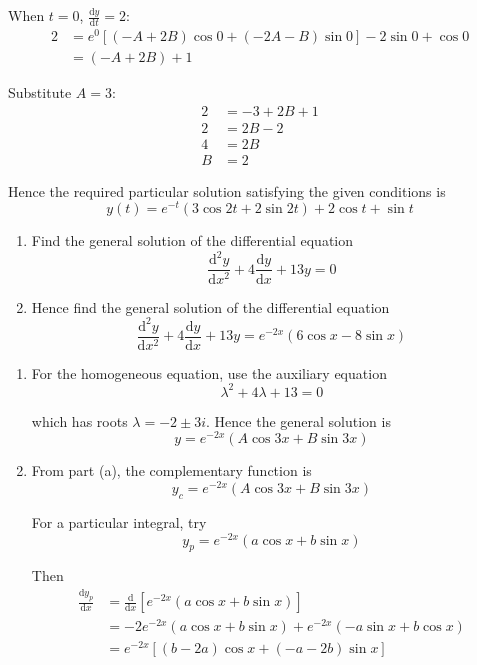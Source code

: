 \documentclass[leqno]{article}
\begin{document}
\begin{enumerate}[
  label=\textbf{\arabic*.},
  leftmargin=*,
  topsep=0pt,
  partopsep=0pt,
  parsep=0pt
]
\begin{djsSolution}
When $t=0$, $\frac{\mathrm{d} y}{\mathrm{d} t}=2$:
\begin{align*}
2&=e^0\left[(-A+2B)\cos 0+(-2A-B)\sin 0\right]-2\sin 0+\cos 0 \\
&=(-A+2B)+1
\end{align*}

Substitute $A=3$:
\begin{align*}
2 &= -3+2B+1 \\
2 &= 2B-2 \\
4 &= 2B \\
B &= 2
\end{align*}

Hence the required particular solution satisfying the given conditions is
\[
y(t)=e^{-t}(3\cos 2t+2\sin 2t)+2\cos t+\sin t
\]
\end{djsSolution}


\newpage

\questionitem

\begin{enumerate}[label=\textbf{(\alph*)}]
  \item Find the general solution of the differential equation
  \[
  \frac{\mathrm{d}^2 y}{\mathrm{d}x^2}+4\frac{\mathrm{d}y}{\mathrm{d}x}+13y=0
  \]
  \item Hence find the general solution of the differential equation
  \[
  \frac{\mathrm{d}^2 y}{\mathrm{d}x^2}+4\frac{\mathrm{d}y}{\mathrm{d}x}+13y=e^{-2x}(6\cos x-8\sin x)
  \]
\end{enumerate}

\vspace*{10pt}

\begin{djsSolution}
\begin{enumerate}[label=\textbf{(\alph*)}]
  \item For the homogeneous equation, use the auxiliary equation
\[
\lambda^2+4\lambda+13=0
\]

which has roots $\lambda=-2\pm 3i$. Hence the general solution is
\[
y=e^{-2x}\left(A\cos 3x+B\sin 3x\right)
\]

  \item From part (a), the complementary function is
\[
y_c=e^{-2x}\left(A\cos 3x+B\sin 3x\right)
\]

For a particular integral, try
\[
y_p=e^{-2x}\left(a\cos x+b\sin x\right)
\]

Then
\begin{align*}
\frac{\mathrm{d}y_p}{\mathrm{d}x}
&= \frac{\mathrm{d}}{\mathrm{d}x}\left[e^{-2x}\left(a\cos x+b\sin x\right)\right] \\
&= -2e^{-2x}\left(a\cos x+b\sin x\right)
+e^{-2x}\left(-a\sin x+b\cos x\right) \\
&= e^{-2x}\left[(b-2a)\cos x+(-a-2b)\sin x\right]
\end{align*}


\end{enumerate}
\end{djsSolution}
\end{enumerate}
\end{document}
